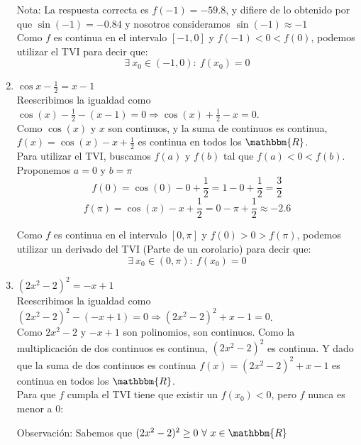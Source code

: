 \documentclass[12pt]{article}
\begin{document}
\begin{enumerate}[\hspace{9px} a)]
        Nota: La respuesta correcta es $f(-1)=-59.8$, y difiere de lo obtenido por que $\sin(-1)=-0.84$ y nosotros consideramos $\sin(-1) \approx -1$\\

        Como $f$ es continua en el intervalo $[-1,0]$ y \(f(-1)<0<f(0)\), podemos utilizar el TVI para decir que: \[\exists \ x_0 \in (-1,0) : \ f(x_0)=0\]

    \item \(\cos x - \displaystyle\frac{1}{2}=x-1\)\\

        Reescribimos la igualdad como \(\cos(x)-\displaystyle\frac{1}{2}-(x-1)=0 \Longrightarrow \cos(x)+\displaystyle\frac{1}{2}-x=0\).\\

        Como $\cos(x)$ y $x$ son continuos, y la suma de continuos es continua, $f(x)=\cos(x)-x+\displaystyle\frac{1}{2}$ es continua en todos los $\mathbbm{R}$.\\

        Para utilizar el TVI, buscamos $f(a)$ y $f(b)$ tal que $f(a)<0<f(b)$.\\

        Proponemos $a=0$ y $b=\pi$
        \[f(0)=\cos(0)-0+\frac{1}{2} = 1-0+\frac{1}{2} = \frac{3}{2}\]
        \[f(\pi)=\cos(x)-x+\frac{1}{2} = 0-\pi+\frac{1}{2} \approx -2.6\]

        Como $f$ es continua en el intervalo $[0,\pi]$ y \(f(0)>0>f(\pi)\), podemos utilizar un derivado del TVI (Parte de un corolario) para decir que: \[\exists \ x_0 \in (0,\pi) : \ f(x_0)=0\]


    \smallskip
    \item \((2x^2-2)^2=-x+1\)\\

    Reescribimos la igualdad como \((2x^2-2)^2-(-x+1)=0 \Longrightarrow (2x^2-2)^2+x-1=0\).\\

    Como $2x^2-2$ y $-x+1$ son polinomios, son continuos. Como la multiplicación de dos continuos es continua, $(2x^2-2)^2$ es continua. Y dado que la suma de dos continuos es continua $f(x)=(2x^2-2)^2+x-1$ es continua en todos los $\mathbbm{R}$.\\

    Para que $f$ cumpla el TVI tiene que existir un $f(x_0)<0$, pero $f$ nunca es menor a 0:

    Observación: Sabemos que $(2x^2-2)^2 \geq 0 \ \forall \ x \in \mathbbm{R}$\\


\end{enumerate}
\end{document}
